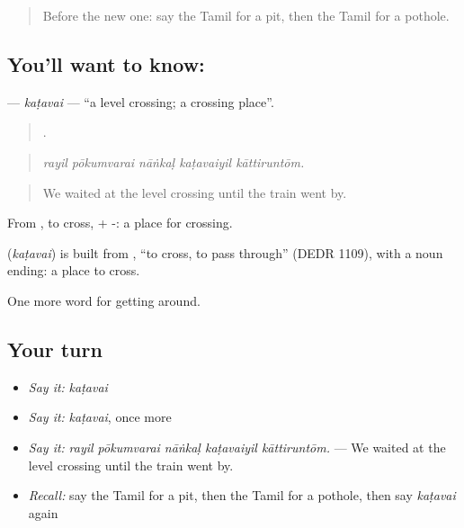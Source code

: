 \begin{quote}
Before the new one: say the Tamil for a pit, then the Tamil for a pothole.
\end{quote}

\subsection*{You'll want to know: }
\textbf{} — \emph{kaṭavai} — \textquotedblleft{}a level crossing; a crossing place\textquotedblright{}.

\begin{quote}
    .
\end{quote}

\begin{quote}
\emph{rayil pōkumvarai nāṅkaḷ kaṭavaiyil kāttiruntōm.}
\end{quote}

\begin{quote}
We waited at the level crossing until the train went by.
\end{quote}

From , to cross, + -: a place for crossing.

\begin{cousinweb}
\textbf{} (\emph{kaṭavai}) is built from , \textquotedblleft{}to cross, to pass through\textquotedblright{} (DEDR 1109), with a noun ending: a place to cross.
\end{cousinweb}

\begin{grammarlens}[title={What you've built}]
One more word for getting around.
\end{grammarlens}

\subsection*{Your turn}
\begin{itemize}
\raggedright
  \item \emph{Say it:} \emph{kaṭavai}
  \item \emph{Say it:} \emph{kaṭavai}, once more
  \item \emph{Say it:} \emph{rayil pōkumvarai nāṅkaḷ kaṭavaiyil kāttiruntōm.} — We waited at the level crossing until the train went by.
  \item \emph{Recall:} say the Tamil for a pit, then the Tamil for a pothole, then say \emph{kaṭavai} again
\end{itemize}

